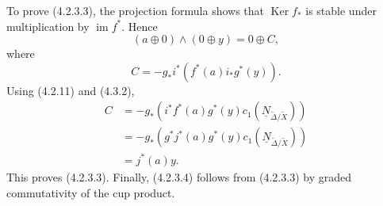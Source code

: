 To prove (4.2.3.3), the projection formula shows that
$\operatorname{Ker}f_*$ is stable under multiplication by
$\operatorname{im}f^*$.  Hence
\[
(a\oplus0)\wedge(0\oplus y)=0\oplus C,
\]
where
\begin{equation}\tag{4.3.3}
C=-g_*i^*\!\left(f^*(a)i_*g^*(y)\right).
\end{equation}
Using (4.2.11) and (4.3.2),
\[
\begin{aligned}
C
&=-g_*\!\left(i^*f^*(a)g^*(y)
      c_1(\underline N_{\widetilde\Delta/\widetilde X})\right)\\
&=-g_*\!\left(g^*j^*(a)g^*(y)
      c_1(\underline N_{\widetilde\Delta/\widetilde X})\right)\\
&=j^*(a)y.
\end{aligned}
\]
This proves (4.2.3.3).  Finally, (4.2.3.4) follows from (4.2.3.3) by graded
commutativity of the cup product.
